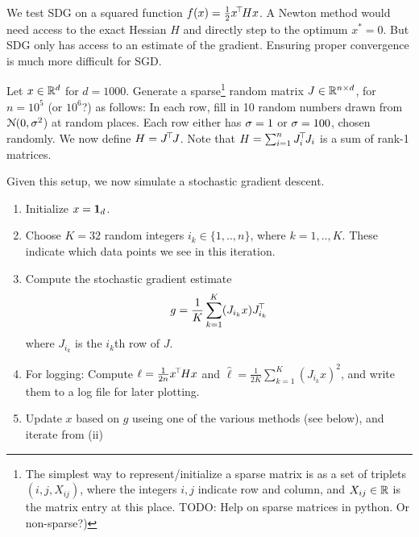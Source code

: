 

\renewcommand{\course}{Machine Learning}
\renewcommand{\exnum}{0}

\exercises
{}
\exercisestitle



We test SDG on a squared function $f(x) = \frac{1}{2} x^{\!\top\!} H x$. A Newton
method would need access to the exact Hessian $H$ and directly step to
the optimum $x^*=0$. But SDG only has access to an estimate of the
gradient. Ensuring proper convergence is much more difficult for SGD.

Let $x\in{\mathbb{R}}^d$ for $d=1000$. Generate a sparse\footnote{The simplest
way to represent/initialize a sparse matrix is as a set of triplets
$(i,j,X_{ij})$, where the integers $i,j$ indicate row and column, and
$X_{ij}\in{\mathbb{R}}$ is the matrix entry at this place. TODO: Help on
sparse matrices in python. Or non-sparse?)} random matrix
$J\in{\mathbb{R}}^{n\times d}$, for $n=10^5$ (or $10^6$?) as follows: In each
row, fill in 10 random numbers drawn from ${\cal N}(0,\sigma^2$) at random
places. Each row either has $\sigma=1$ or $\sigma=100$, chosen randomly. We
now define $H = J^{\!\top\!} J$. Note that $H=\sum_{i=1}^n J_i^{\!\top\!} J_i$ is a
sum of rank-1 matrices.

Given this setup, we now simulate a stochastic gradient descent.
\begin{enumerate}
\item Initialize $x={{\bf 1}}_d$.
\item Choose $K=32$ random integers $i_k \in \{1,..,n\}$, where $k=1,..,K$. These indicate which data points we see in this iteration.
\item Compute the stochastic gradient estimate
$$ g = \frac{1}{K} \sum_{k=1}^K (J_{i_k} x) J_{i_k}^{\!\top\!} $$
where $J_{i_k}$ is the $i_k$th row of $J$.
\item For logging: Compute $\ell=\frac{1}{2n} x^{\!\top\!} H x$ and $\hat\ell=\frac{1}{2K} \sum_{k=1}^K (J_{i_k} x)^2$, and write them to a log file for later plotting.
\item Update $x$ based on $g$ useing one of the various methods (see below), and iterate from (ii)
\end{enumerate}





